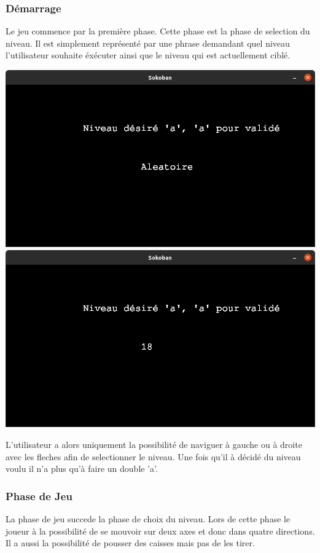 \documentclass[a4paper,12pt]{article} %
\begin{document}
\subsubsection{Démarrage}

Le jeu commence par la première phase.
Cette phase est la phase de selection du niveau.
Il est simplement représenté par une phrase demandant quel niveau l'utilisateur souhaite éxécuter ainsi que le niveau qui est actuellement ciblé.

\includegraphics[scale = 0.25]{../picture/starting.png}
\includegraphics[scale = 0.25]{../picture/starting2.png}

L'utilisateur a alors uniquement la possibilité de naviguer à gauche ou à droite avec les fleches afin de selectionner le niveau.
Une fois qu'il à décidé du niveau voulu il n'a plus qu'à faire un double 'a'.

\subsubsection{Phase de Jeu}

La phase de jeu succede la phase de choix du niveau.
Lors de cette phase le joueur à la possibilité de se mouvoir sur deux axes et donc dans quatre directions.
Il a aussi la possibilité de pousser des caisses mais pas de les tirer.
\end{document}
